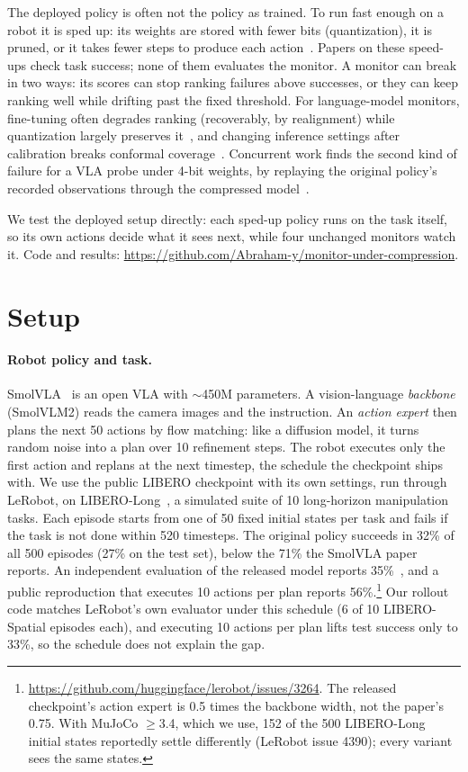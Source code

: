 \documentclass{article}
\begin{document}
The deployed policy is often not the policy as trained. To run fast enough on a robot it is sped
up: its weights are stored with fewer bits (quantization), it is pruned, or it takes fewer steps
to produce each action~\citep{vlaquantbench,quantvla,care}. Papers on these speed-ups check task
success; none of them evaluates the monitor. A monitor can break in two ways: its scores can stop
ranking failures above successes, or they can keep ranking well while drifting past the fixed
threshold. For language-model monitors, fine-tuning often degrades ranking (recoverably, by
realignment) while quantization largely preserves it~\citep{duan}, and changing inference
settings after calibration breaks conformal coverage~\citep{doula}. Concurrent work finds the
second kind of failure for a VLA probe under 4-bit weights, by replaying
the original policy's recorded observations through the compressed model~\citep{rankpreserving}.

We test the deployed setup directly: each sped-up policy runs on the task itself, so its own
actions decide what it sees next, while four unchanged monitors watch it. Code and results:
\url{https://github.com/Abraham-y/monitor-under-compression}.

\section{Setup}
\label{sec:setup}

\paragraph{Robot policy and task.} SmolVLA~\citep{smolvla} is an open VLA with ${\sim}$450M
parameters. A vision-language \emph{backbone} (SmolVLM2) reads the camera images and the
instruction. An \emph{action expert} then plans the next 50 actions by flow matching: like a
diffusion model, it turns random noise into a plan over 10 refinement steps. The robot executes
only the first action and replans at the next timestep, the schedule the checkpoint ships with. We
use the public LIBERO checkpoint with its own settings, run through LeRobot, on
LIBERO-Long~\citep{libero}, a simulated suite of 10 long-horizon manipulation tasks. Each episode
starts from one of 50 fixed initial states per task and fails if the task is not done within 520
timesteps. The original policy succeeds in 32\% of all 500 episodes (27\% on the test set), below
the 71\% the SmolVLA paper reports. An independent evaluation of the released model reports
35\%~\citep{onestep}, and a public reproduction that executes 10 actions per plan reports
56\%.\footnote{\url{https://github.com/huggingface/lerobot/issues/3264}. The released checkpoint's
action expert is 0.5 times the backbone width, not the paper's 0.75. With MuJoCo $\geq$3.4, which we
use, 152 of the 500 LIBERO-Long initial states reportedly settle differently (LeRobot issue 4390);
every variant sees the same states.} Our rollout code
matches LeRobot's own evaluator under this schedule (6 of 10 LIBERO-Spatial episodes each), and
executing 10 actions per plan lifts test success only to 33\%, so the schedule does not explain the
gap.
\end{document}
